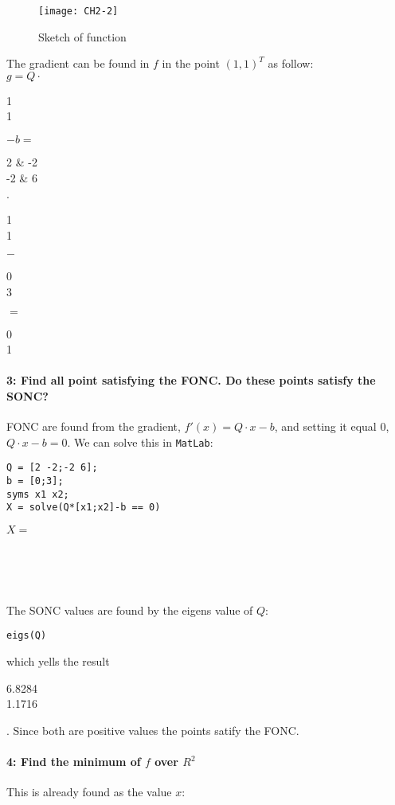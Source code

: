 \documentclass[Main]{subfiles}
\begin{document}
\begin{figure}[hbtp]
\centering
\texttt{[image: CH2-2]}
\vspace{-15pt}
\caption{Sketch of function}
\label{fig:ch2-2}
\end{figure}

The gradient can be found in $f$ in the point $(1,1)^T$ as follow:
\\
$g = Q \cdot$
\begin{ArgMat}
1 \\ 1
\end{ArgMat}
$- b = $
\begin{ArgMat}
2 & -2 \\
-2 & 6
\end{ArgMat}
$\cdot$
\begin{ArgMat}
1 \\ 1
\end{ArgMat}
$-$
\begin{ArgMat}
0 \\ 3
\end{ArgMat}
$=$
\begin{ArgMat}
0 \\ 1
\end{ArgMat}

\paragraph{3: Find all point satisfying the FONC. Do these points satisfy the SONC?}

FONC are found from the gradient, $f'(x) = Q \cdot x -b$, and setting it equal 0, $Q \cdot x -b = 0$.
We can solve this in \texttt{MatLab}:
\begin{lstlisting}[caption=FONC, style=Code-Matlab, label=lst:ch2-31]
Q = [2 -2;-2 6];
b = [0;3];
syms x1 x2;
X = solve(Q*[x1;x2]-b == 0)
\end{lstlisting}
$X = $
\begin{ArgMat}
 \\
\end{ArgMat}
\\\\
The SONC values are found by the eigens value of $Q$:
\begin{lstlisting}[caption=SONC, style=Code-Matlab, label=lst:ch2-32]
eigs(Q)
\end{lstlisting}
which yells the result 
\begin{ArgMat}
6.8284 \\
1.1716
\end{ArgMat}.
Since both are positive values the points satify the FONC.


\paragraph{4: Find the minimum of $f$ over $R^2$}
This is already found as the value $x$:
\begin{ArgMat}
 \\
\end{ArgMat}
\end{document}
